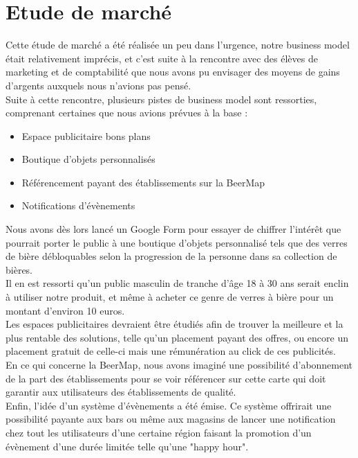 \documentclass{report}
\begin{document}
\chapter{Etude de marché} %

	Cette étude de marché a été réalisée un peu dans l'urgence, notre business model était relativement imprécis, et c'est suite à la rencontre avec des élèves de marketing et de comptabilité que nous avons pu envisager des moyens de gains d'argents auxquels nous n'avions pas pensé.\\

	Suite à cette rencontre, plusieurs pistes de business model sont ressorties, comprenant certaines que nous avions prévues à la base : \\

	\begin{itemize}
		\item Espace publicitaire bons plans
		\item Boutique d'objets personnalisés
		\item Référencement payant des établissements sur la BeerMap
		\item Notifications d'évènements
	\end{itemize}

	Nous avons dès lors lancé un Google Form pour essayer de chiffrer l'intérêt que pourrait porter le public à une boutique d'objets personnalisé tels que des verres de bière débloquables selon la progression de la personne dans sa collection de bières.\\
	Il en est ressorti qu'un public masculin de tranche d'âge 18 à 30 ans serait enclin à utiliser notre produit, et même à acheter ce genre de verres à bière pour un montant d'environ 10 euros.\\

	Les espaces publicitaires devraient être étudiés afin de trouver la meilleure et la plus rentable des solutions, telle qu'un placement payant des offres, ou encore un placement gratuit de celle-ci mais une rémunération au click de ces publicités.\\

	En ce qui concerne la BeerMap, nous avons imaginé une possibilité d'abonnement de la part des établissements pour se voir référencer sur cette carte qui doit garantir aux utilisateurs des établissements de qualité.\\

	Enfin, l'idée d'un système d'évènements a été émise. Ce système offrirait une possibilité payante aux bars ou même aux magasins de lancer une notification chez tout les utilisateurs d'une certaine région faisant la promotion d'un évènement d'une durée limitée telle qu'une "happy hour".\\
\end{document}
